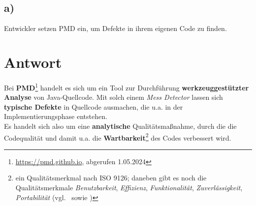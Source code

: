 \subsection*{a)}

Entwickler setzen PMD ein, um Defekte in ihrem eigenen Code zu finden.

\section*{Antwort}
Bei \textbf{PMD}\footnote{
    \url{https://pmd.github.io}, abgerufen 1.05.2024
} handelt es sich um ein Tool zur Durchführung \textbf{werkzeuggestützter Analyse} von Java-Quellcode.
Mit solch einem \textit{Mess Detector} lassen sich \textbf{typische Defekte} in Quellcode ausmachen, die u.a. in der Implementierungsphase entstehen.\\
Es handelt sich also um eine \textbf{analytische} Qualitätsmaßnahme, durch die die Codequalität und damit u.a. die \textbf{Wartbarkeit}\footnote{
ein Qualitätsmerkmal nach ISO 9126; daneben gibt es noch die Qualitätsmerkmale \textit{Benutzbarkeit}, \textit{Effizienz}, \textit{Funktionalität}, \textit{Zuverlässigkeit}, \textit{Portabilität} (vgl.~\cite[Abb. 1.2, 3]{Wed09c} sowie \cite[463 f.]{Bal08})
} des Codes verbessert wird.